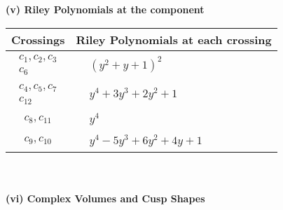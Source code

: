\documentclass[1p]{elsarticle_modified}
\theoremstyle{definition}
\begin{document}
\newpage\renewcommand{\arraystretch}{1}
\flushleft \textbf{(v) Riley Polynomials at the component}\newline \\
\begin{tabular}{m{50pt}|m{274pt}}
Crossings & \hspace{64pt}Riley Polynomials at each crossing \\
\hline $$\begin{aligned}c_{1},c_{2},c_{3}\\c_{6}\end{aligned}$$&$\begin{aligned}
&(y^2+y+1)^2
\end{aligned}$\\
\hline $$\begin{aligned}c_{4},c_{5},c_{7}\\c_{12}\end{aligned}$$&$\begin{aligned}
&y^4+3 y^3+2 y^2+1
\end{aligned}$\\
\hline $$\begin{aligned}c_{8},c_{11}\end{aligned}$$&$\begin{aligned}
&y^4
\end{aligned}$\\
\hline $$\begin{aligned}c_{9},c_{10}\end{aligned}$$&$\begin{aligned}
&y^4-5 y^3+6 y^2+4 y+1
\end{aligned}$\\
\hline
\end{tabular}\\~\\
\newpage\flushleft \textbf{(vi) Complex Volumes and Cusp Shapes}
\end{document}
